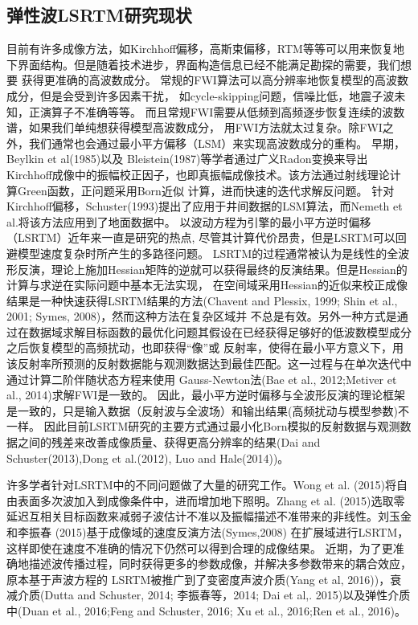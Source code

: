 \subsection{弹性波LSRTM研究现状}

目前有许多成像方法，如Kirchhoff偏移，高斯束偏移，RTM等等可以用来恢复地下界面结构。但是随着技术进步，界面构造信息已经不能满足勘探的需要，我们想要
获得更准确的高波数成分。
常规的FWI算法可以高分辨率地恢复模型的高波数成分，但是会受到许多因素干扰，
如cycle-skipping问题，信噪比低，地震子波未知，正演算子不准确等等。
而且常规FWI需要从低频到高频逐步恢复连续的波数谱，如果我们单纯想获得模型高波数成分，
用FWI方法就太过复杂。除FWI之外，我们通常也会通过最小平方偏移（LSM）来实现高波数成分的重构。
早期，Beylkin
et al(1985)\cite{BeylkinEtAl1985}以及
Bleistein(1987)\cite{Bleistein1987}等学者通过广义Radon变换来导出Kirchhoff成像中的振幅校正因子，也即真振幅成像技术。该方法通过射线理论计算Green函数，正问题采用Born近似
计算，进而快速的迭代求解反问题。
针对Kirchhoff偏移，Schuster(1993)\cite{Schuster1993}提出了应用于井间数据的LSM算法，而Nemeth et al.\cite{Nemeth1999}将该方法应用到了地面数据中。
以波动方程为引擎的最小平方逆时偏移（LSRTM）近年来一直是研究的热点,
尽管其计算代价昂贵，但是LSRTM可以回避模型速度复杂时所产生的多路径问题。
LSRTM的过程通常被认为是线性的全波形反演，理论上施加Hessian矩阵的逆就可以获得最终的反演结果。但是Hessian的计算与求逆在实际问题中基本无法实现，
在空间域采用Hessian的近似来校正成像结果是一种快速获得LSRTM结果的方法(Chavent and Plessix, 
1999\cite{ChaventEtAl1999}; Shin et al., 2001\cite{shin2001improved}; Symes,
2008\cite{Symes2008})，然而这种方法在复杂区域并
不总是有效。另外一种方式是通过在数据域求解目标函数的最优化问题其假设在已经获得足够好的低波数模型成分之后恢复模型的高频扰动，也即获得“像”或
反射率，使得在最小平方意义下，用该反射率所预测的反射数据能与观测数据达到最佳匹配。这一过程与在单次迭代中通过计算二阶伴随状态方程来使用
Gauss-Newton法(Bae et al., 2012\cite{bae2012frequency};Metiver et al.,
2014\cite{Metivier2014})求解FWI是一致的。
因此，最小平方逆时偏移与全波形反演的理论框架是一致的，只是输入数据（反射波与全波场）和输出结果(高频扰动与模型参数)不一样。
因此目前LSRTM研究的主要方式通过最小化Born模拟的反射数据与观测数据之间的残差来改善成像质量、获得更高分辨率的结果(Dai and
Schuster(2013)\cite{Dai2013},Dong et al.(2012)\cite{Dong2012}, Luo and
Hale(2014)\cite{Luo2014})。

许多学者针对LSRTM中的不同问题做了大量的研究工作。Wong et al.
(2015)\cite{WongEtAl2015}将自由表面多次波加入到成像条件中，进而增加地下照明。Zhang et al.
(2015)\cite{ZhangEtAl2015}选取零延迟互相关目标函数来减弱子波估计不准以及振幅描述不准带来的非线性。刘玉金和李振春
(2015)\cite{刘玉金2015}基于成像域的速度反演方法(Symes,2008\cite{Symes2008a})
在扩展域进行LSRTM，这样即使在速度不准确的情况下仍然可以得到合理的成像结果。
近期，为了更准确地描述波传播过程，同时获得更多的参数成像，并解决多参数带来的耦合效应，原本基于声波方程的
LSRTM被推广到了变密度声波介质(Yang et al, 2016)\cite{Yang2016})，衰减介质(Dutta and
Schuster, 2014\cite{DuttaEtAl2014}; 李振春等，2014\cite{李振春2014}; Dai et al,.
2015\cite{Dai2015})以及弹性介质中(Duan et al., 2016\cite{Duan2016};Feng and Schuster,
2016\cite{Feng2016}; Xu et al., 2016\cite{Xu2016};Ren et al., 2016\cite{RenEtAl2016})。

